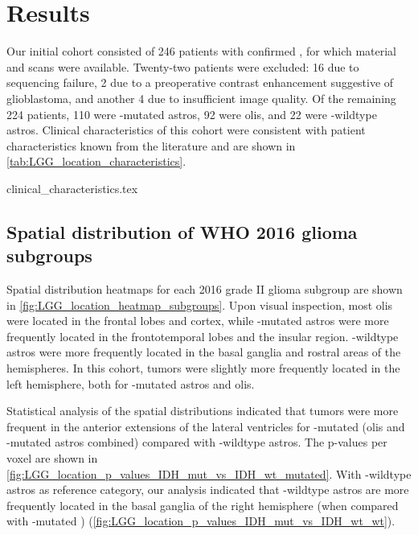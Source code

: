 \section{Results}

Our initial cohort consisted of \num{246} patients with confirmed , for which  material and  scans were available.
Twenty-two patients were excluded: \num{16} due to sequencing failure, \num{2} due to a preoperative contrast enhancement suggestive of \gls{glioblastoma}, and another 4 due to insufficient image quality.
Of the remaining \num{224} patients, \num{110} were -mutated \glspl{astro}, \num{92} were \glspl{oli}, and 22 were -wildtype \glspl{astro}.
Clinical characteristics of this cohort were consistent with  patient characteristics known from the literature and are shown in \cref{tab:LGG_location_characteristics}.

{clinical_characteristics.tex}

\subsection{Spatial distribution of WHO 2016 glioma subgroups}

Spatial distribution heatmaps for each  2016 grade II glioma subgroup are shown in \cref{fig:LGG_location_heatmap_subgroups}.
Upon visual inspection, most \glspl{oli} were located in the frontal lobes and cortex, while -mutated \glspl{astro} were more frequently located in the frontotemporal lobes and the insular region.
-wildtype \glspl{astro} were more frequently located in the basal ganglia and rostral areas of the hemispheres.
In this cohort, \glspl{tumor} were slightly more frequently located in the left hemisphere, both for -mutated \glspl{astro} and \glspl{oli}.

Statistical analysis of the spatial distributions indicated that \glspl{tumor} were more frequent in the anterior extensions of the lateral ventricles for -mutated  (\glspl{oli} and -mutated \glspl{astro} combined) compared with -wildtype \glspl{astro}.
The p-values per voxel are shown in \cref{fig:LGG_location_p_values_IDH_mut_vs_IDH_wt_mutated}.
With -wildtype \glspl{astro} as reference category, our analysis indicated that -wildtype \glspl{astro} are more frequently located in the basal ganglia of the right hemisphere (when compared with -mutated ) (\cref{fig:LGG_location_p_values_IDH_mut_vs_IDH_wt_wt}).


